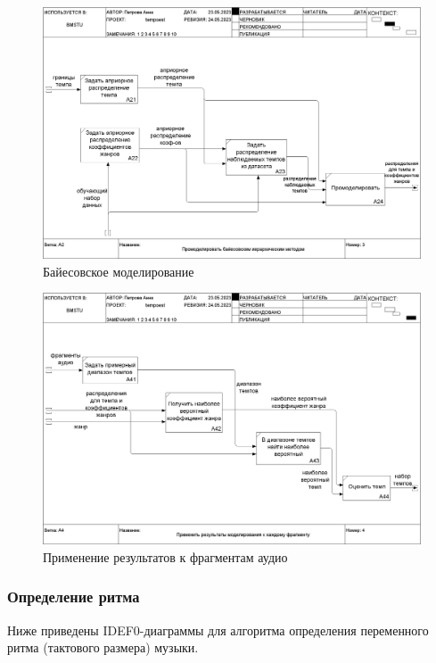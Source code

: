 \begin{figure}[h]
	\centering
	\includegraphics[scale=0.25]{inc/img/tempo_idef/03_A2.png}
	\caption{Байесовское моделирование}
	\label{img:tempo_2}
\end{figure}

\begin{figure}[h]
	\centering
	\includegraphics[scale=0.25]{inc/img/tempo_idef/04_A4.png}
	\caption{Применение результатов к фрагментам аудио}
	\label{img:tempo_3}
\end{figure}

\clearpage

\subsubsection{Определение ритма}

Ниже приведены IDEF0-диаграммы для алгоритма определения переменного ритма (тактового размера) музыки.

